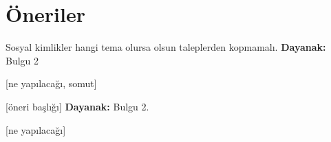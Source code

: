 \section{Öneriler}


\begin{oneri}{Sosyal kimlikler hangi tema olursa olsun taleplerden kopmamalı.}
\textbf{Dayanak:} Bulgu 2

[ne yapılacağı, somut]
\end{oneri}

\begin{oneri}{[öneri başlığı]}
\textbf{Dayanak:} Bulgu 2.

[ne yapılacağı]
\end{oneri}

